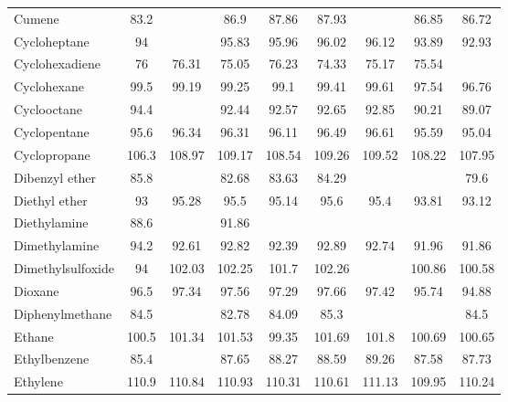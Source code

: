 \begin{center}
\begin{longtable}{l | c c c c c c c c}
 Cumene                         &  83.2 &        &      86.9 &  87.86 &   87.93 &          &  86.85 &   86.72 \\
 Cycloheptane                   &    94 &        &     95.83 &  95.96 &   96.02 &    96.12 &  93.89 &   92.93 \\
 Cyclohexadiene                 &    76 &  76.31 &     75.05 &  76.23 &   74.33 &    75.17 &  75.54 &         \\
 Cyclohexane                    &  99.5 &  99.19 &     99.25 &   99.1 &   99.41 &    99.61 &  97.54 &   96.76 \\
 Cyclooctane                    &  94.4 &        &     92.44 &  92.57 &   92.65 &    92.85 &  90.21 &   89.07 \\
 Cyclopentane                   &  95.6 &  96.34 &     96.31 &  96.11 &   96.49 &    96.61 &  95.59 &   95.04 \\
 Cyclopropane                   & 106.3 & 108.97 &    109.17 & 108.54 &  109.26 &   109.52 & 108.22 &  107.95 \\
 Dibenzyl ether                 &  85.8 &        &     82.68 &  83.63 &   84.29 &          &        &    79.6 \\
 Diethyl ether                  &    93 &  95.28 &      95.5 &  95.14 &    95.6 &     95.4 &  93.81 &   93.12 \\
 Diethylamine                   &  88.6 &        &     91.86 &        &         &          &        &         \\
 Dimethylamine                  &  94.2 &  92.61 &     92.82 &  92.39 &   92.89 &    92.74 &  91.96 &   91.86 \\
 Dimethylsulfoxide              &    94 & 102.03 &    102.25 &  101.7 &  102.26 &          & 100.86 &  100.58 \\
 Dioxane                        &  96.5 &  97.34 &     97.56 &  97.29 &   97.66 &    97.42 &  95.74 &   94.88 \\
 Diphenylmethane                &  84.5 &        &     82.78 &  84.09 &    85.3 &          &        &    84.5 \\
 Ethane                         & 100.5 & 101.34 &    101.53 &  99.35 &  101.69 &    101.8 & 100.69 &  100.65 \\
 Ethylbenzene                   &  85.4 &        &     87.65 &  88.27 &   88.59 &    89.26 &  87.58 &   87.73 \\
 Ethylene                       & 110.9 & 110.84 &    110.93 & 110.31 &  110.61 &   111.13 & 109.95 &  110.24 \\

\end{longtable}
\end{center}
